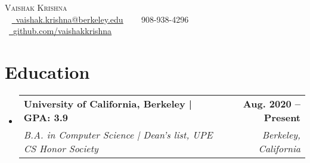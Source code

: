 \documentclass[letterpaper,11pt]{article}
\makeatletter
\newcommand{\resumeSubheading}[4]{
  \vspace{-2pt}\item
    \begin{tabular*}{1.0\textwidth}[t]{l@{\extracolsep{\fill}}r}
      \vspace{2pt}
      \textbf{\normalsize #1} & \textbf{\small #2} \\ 
      \textit{\small#3} & \textit{\small #4} \\
    \end{tabular*}\vspace{-5pt}
}
\newcommand{\resumeSubHeadingListStart}{\begin{itemize}[leftmargin=0.0in, label={}]}
\newcommand{\resumeSubHeadingListEnd}{\end{itemize}}
\makeatother
\begin{document}

\begin{center}
    {\Huge \scshape Vaishak Krishna} \\ \vspace{6pt}
    ~ \small \href{mailto:vaishak.krishna@gmail.com}{\raisebox{-0.2\height}\faEnvelope\  \underline{vaishak.krishna@berkeley.edu}} ~
    ~\small \raisebox{-0.1\height}\faPhone\ 908-938-4296 ~
    ~\href{https://github.com/vaishakkrishna}{\raisebox{-0.2\height}\faGithub\ \underline{github.com/vaishakkrishna}}~
    \vspace{-8pt}
\end{center}


\section{Education}
  \resumeSubHeadingListStart
    \resumeSubheading
  {University of California, Berkeley | GPA: 3.9}{Aug. 2020 -- Present}
      {B.A. in Computer Science | Dean's list, UPE CS Honor Society}{Berkeley, California}
  \resumeSubHeadingListEnd
  
\end{document}
